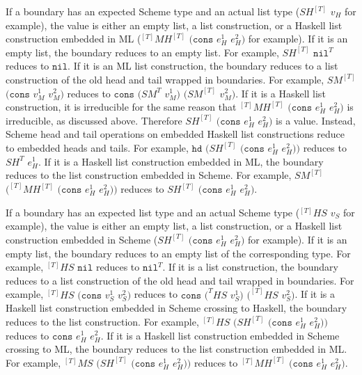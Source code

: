If a boundary has an expected Scheme type and an actual list type ($SH^{[T]}$ $v_{H}$ for example), the value is either an empty list, a list construction, or a Haskell list construction embedded in ML ($^{[T]}MH^{[T]}$ $(\mathtt{cons}$ $e_{H}^{1}$ $e_{H}^{2})$ for example).  If it is an empty list, the boundary reduces to an empty list.  For example, $SH^{[T]}$ $\mathtt{nil}^{T}$ reduces to $\mathtt{nil}$.  If it is an ML list construction, the boundary reduces to a list construction of the old head and tail wrapped in boundaries.  For example, $SM^{[T]}$ $(\mathtt{cons}$ $v_{M}^{1}$ $v_{M}^{2})$ reduces to $\mathtt{cons}$ $(SM^{T}$ $v_{M}^{1})$ $(SM^{[T]}$ $v_{M}^{2})$.  If it is a Haskell list construction, it is irreducible for the same reason that $^{[T]}MH^{[T]}$ $(\mathtt{cons}$ $e_{H}^{1}$ $e_{H}^{2})$ is irreducible, as discussed above.  Therefore $SH^{[T]}$ $(\mathtt{cons}$ $e_{H}^{1}$ $e_{H}^{2})$ is a value.  Instead, Scheme head and tail operations on embedded Haskell list constructions reduce to embedded heads and tails.  For example, $\mathtt{hd}$ $(SH^{[T]}$ $(\mathtt{cons}$ $e_{H}^{1}$ $e_{H}^{2}))$ reduces to $SH^{T}$ $e_{H}^{1}$.  If it is a Haskell list construction embedded in ML, the boundary reduces to the list construction embedded in Scheme.  For example, $SM^{[T]}$ $(^{[T]}MH^{[T]}$ $(\mathtt{cons}$ $e_{H}^{1}$ $e_{H}^{2}))$ reduces to $SH^{[T]}$ $(\mathtt{cons}$ $e_{H}^{1}$ $e_{H}^{2})$.

If a boundary has an expected list type and an actual Scheme type ($^{[T]}HS$ $v_{S}$ for example), the value is either an empty list, a list construction, or a Haskell list construction embedded in Scheme ($SH^{[T]}$ $(\mathtt{cons}$ $e_{H}^{1}$ $e_{H}^{2})$ for example).  If it is an empty list, the boundary reduces to an empty list of the corresponding type.  For example, $^{[T]}HS$ $\mathtt{nil}$ reduces to $\mathtt{nil}^{T}$.  If it is a list construction, the boundary reduces to a list construction of the old head and tail wrapped in boundaries.  For example, $^{[T]}HS$ $(\mathtt{cons}$ $v_{S}^{1}$ $v_{S}^{2})$ reduces to $\mathtt{cons}$ $(^{T}HS$ $v_{S}^{1})$ $(^{[T]}HS$ $v_{S}^{2})$.  If it is a Haskell list construction embedded in Scheme crossing to Haskell, the boundary reduces to the list construction.  For example, $^{[T]}HS$ $(SH^{[T]}$ $(\mathtt{cons}$ $e_{H}^{1}$ $e_{H}^{2}))$ reduces to $\mathtt{cons}$ $e_{H}^{1}$ $e_{H}^{2}$.  If it is a Haskell list construction embedded in Scheme crossing to ML, the boundary reduces to the list construction embedded in ML.  For example, $^{[T]}MS$ $(SH^{[T]}$ $(\mathtt{cons}$ $e_{H}^{1}$ $e_{H}^{2}))$ reduces to $^{[T]}MH^{[T]}$ $(\mathtt{cons}$ $e_{H}^{1}$ $e_{H}^{2})$.

